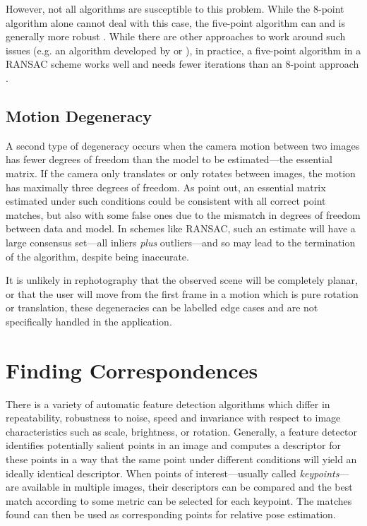 However, not all algorithms are susceptible to this problem. While the 8-point
algorithm alone cannot deal with this case, the five-point algorithm can and is
generally more robust \citep{li2006}. While there are other approaches to work
around such issues (e.g. an algorithm developed by \citet{chum2005} or
\citet{decker2008}), in practice, a five-point algorithm in a RANSAC scheme
works well and needs fewer iterations than an 8-point approach \citep{li2006}.

\subsection{Motion Degeneracy}

A second type of degeneracy occurs when the camera motion between two images has
fewer degrees of freedom than the model to be estimated---the essential matrix.
If the camera only translates or only rotates between images, the motion has
maximally three degrees of freedom. As \citet{decker2008} point out, an
essential matrix estimated under such conditions could be consistent with all
correct point matches, but also with some false ones due to the mismatch in
degrees of freedom between data and model. In schemes like RANSAC, such an
estimate will have a large consensus set---all inliers \emph{plus}
outliers---and so may lead to the termination of the algorithm, despite being
inaccurate.

It is unlikely in rephotography that the observed scene will be completely
planar, or that the user will move from the first frame in a motion which is
pure rotation or translation, these degeneracies can be labelled edge cases and
are not specifically handled in the application.

\section{Finding Correspondences}

There is a variety of automatic feature detection algorithms which differ in
repeatability, robustness to noise, speed and invariance with respect to image
characteristics such as scale, brightness, or rotation. 
Generally, a feature detector identifies potentially salient points in an image
and computes a descriptor for these points in a way that the same point under
different conditions will yield an ideally identical descriptor. When points of
interest---usually called \emph{keypoints}---are available in multiple images,
their descriptors can be compared and the best match according to some metric
can be selected for each keypoint. The matches found can then be used as
corresponding points for relative pose estimation.


